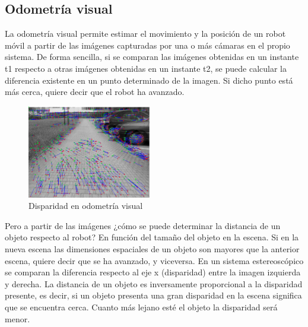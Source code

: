 \subsection{Odometría visual}
La odometría visual permite estimar el movimiento y la posición de un robot
móvil a partir de las imágenes capturadas por una o más cámaras en el propio
sistema. De forma sencilla, si se comparan las imágenes obtenidas en un instante
t1 respecto a otras imágenes obtenidas en un instante t2, se puede calcular la
diferencia existente en un punto determinado de la imagen. Si dicho punto está
más cerca, quiere decir que el robot ha avanzado.

\begin{figure}
  \vspace{-20pt}
  \begin{center}
    \includegraphics[width=0.48\textwidth]{images/cap2/OdometriaVisual.eps}
  \end{center}
  \vspace{-20pt}
  \caption{Disparidad en odometría visual}
  \vspace{-10pt}
  \label{fig:OdometriaVisual}
\end{figure}

Pero a partir de las imágenes ¿cómo se puede determinar la distancia de un
objeto respecto al robot? En función del tamaño del objeto en la escena. Si en
la nueva escena las dimensiones espaciales de un objeto son mayores que la
anterior escena, quiere decir que se ha avanzado, y viceversa. En un sistema
estereoscópico se comparan la diferencia respecto al eje x (disparidad) entre
la imagen izquierda y derecha. La distancia de un objeto es inversamente
proporcional a la disparidad presente, es decir, si un objeto presenta una gran
disparidad en la escena significa que se encuentra cerca. Cuanto más lejano esté
el objeto la disparidad será menor.


